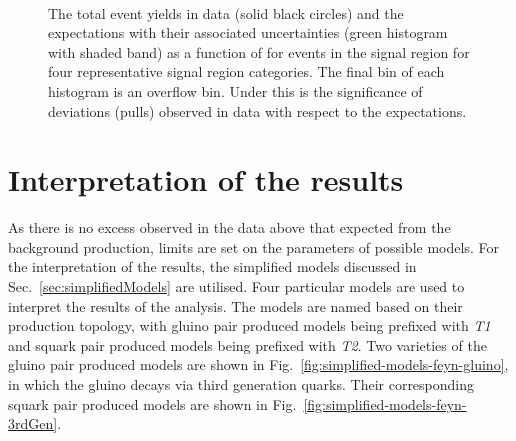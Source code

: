 \begin{figure}[!tbhp]
\begin{center}
{    }~~
  \end{center}
  \caption{The total event yields in data (solid black circles) and
  the \SM expectations with their associated uncertainties (green
  histogram with shaded band) as a function of \MHT for events in the
  signal region for four representative signal region categories. The
  final bin of each histogram is an overflow bin. Under this is the
  significance of deviations (pulls) observed in data with respect to
  the \SM expectations. \label{fig:mht-templates} 
  }
\end{figure}

\clearpage

\section{Interpretation of the results}
\label{sec:signalModel}

As there is no excess observed in the data above that expected from
the \SM background production, limits are set on the parameters of
possible \SUSY models. For the interpretation of the results, the
simplified models discussed in Sec.~\ref{sec:simplifiedModels} are
utilised. Four particular models are used to interpret the results of
the analysis. The models are named based on their production topology,
with gluino pair produced models being prefixed with \emph{T1} and
squark pair produced models being prefixed with \emph{T2}. Two
varieties of the gluino pair produced models are shown in
Fig.~\ref{fig:simplified-models-feyn-gluino}, in which the gluino
decays via third generation quarks. Their corresponding squark pair
produced models are shown in
Fig.~\ref{fig:simplified-models-feyn-3rdGen}.  

